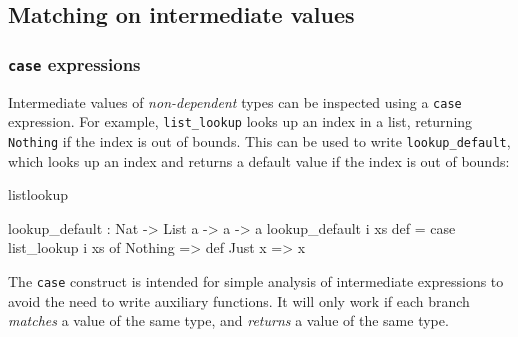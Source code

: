 \subsection{Matching on intermediate values}

%
%
%
%
%
%
%
%
%

\subsubsection{\texttt{case} expressions}

Intermediate values of \emph{non-dependent} types can be inspected using a
\texttt{case} expression.  For example, \texttt{list\_lookup} looks up an index
in a list, returning \texttt{Nothing} if the index is out of bounds. This can
be used to write \texttt{lookup\_default}, which looks up an index and
returns a default value if the index is out of bounds:

\begin{SaveVerbatim}{listlookup}

lookup_default : Nat -> List a -> a -> a
lookup_default i xs def = case list_lookup i xs of
                              Nothing => def
                              Just x => x

\end{SaveVerbatim}

The \texttt{case} construct is intended for simple analysis of intermediate
expressions to avoid the need to write auxiliary functions.  It will
only work if each branch \emph{matches} a value of the same type, and
\emph{returns} a value of the same type.

